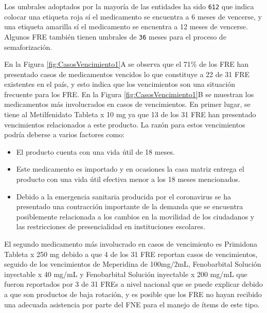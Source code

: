 \documentclass[
  oneside]{book}
\begin{document}
Los umbrales adoptados por la mayoría de las entidades ha sido \texttt{6\textbar{}12} que indica colocar una etiqueta roja sí el medicamento se encuentra a 6 meses de vencerse, y una etiqueta amarilla sí el medicamento se encuentra a 12 meses de vencerse. Algunos FRE también tienen umbrales de \texttt{3\textbar{}6} meses para el proceso de semaforización.

En la Figura \ref{fig:CasosVencimiento1}A se observa que el 71\% de los FRE han presentado casos de medicamentos vencidos lo que constituye a 22 de 31 FRE existentes en el país, y esto indica que los vencimientos son una situación frecuente para los FRE. En la Figura \ref{fig:CasosVencimiento1}B se muestran los medicamentos más involucrados en casos de vencimientos. En primer lugar, se tiene al Metilfenidato Tableta x 10 mg ya que 13 de los 31 FRE han presentado vencimientos relacionados a este producto. La razón para estos vencimientos podría deberse a varios factores como:

\begin{itemize}
\item
  El producto cuenta con una vida útil de 18 meses.
\item
  Este medicamento es importado y en ocasiones la casa matriz entrega el producto con una vida útil efectiva menor a los 18 meses mencionados.
\item
  Debido a la emergencia sanitaria producida por el coronavirus se ha presentado una contracción importante de la demanda que se encuentra posiblemente relacionada a los cambios en la movilidad de los ciudadanos y las restricciones de presencialidad en instituciones escolares.
\end{itemize}

El segundo medicamento más involucrado en casos de vencimiento es Primidona Tableta x 250 mg debido a que 4 de los 31 FRE reportan casos de vencimientos, seguido de los vencimientos de Meperidina de 100mg/2mL, Fenobarbital Solución inyectable x 40 mg/mL y Fenobarbital Solución inyectable x 200 mg/mL que fueron reportados por 3 de 31 FREs a nivel nacional que se puede explicar debido a que son productos de baja rotación, y es posible que los FRE no hayan recibido una adecuada asistencia por parte del FNE para el manejo de ítems de este tipo.
\end{document}
